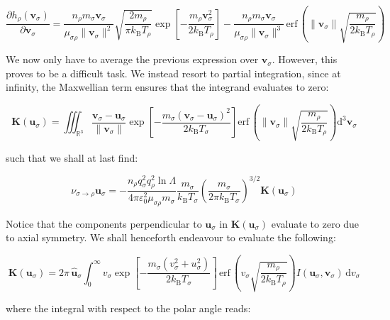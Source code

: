 \begin{equation}
    \frac{\partial h_\rho(\mathbf{v}_\sigma)}{\partial\mathbf{v}_\sigma}=\frac{n_\rho m_\sigma\mathbf{v}_\sigma}{\mu_{\sigma\rho}\|\mathbf{v}_\sigma\|^2}\sqrt{\frac{2m_\rho}{\pi k_\mathrm{B}T_\rho}}\exp{\left[-\frac{m_\rho\mathbf{v}_\sigma^2}{2k_\mathrm{B}T_\rho}\right]}-\frac{n_\rho m_\sigma\mathbf{v}_\sigma}{\mu_{\sigma\rho}\|\mathbf{v}_\sigma\|^3}\,\text{erf}\,\left(\|\mathbf{v}_\sigma\|\sqrt{\frac{m_\rho}{2k_\mathrm{B}T_\rho}}\right)
\end{equation}

We now only have to average the previous expression over $\mathbf{v}_\sigma$. However, this proves to be a difficult task. We instead resort to partial integration, since at infinity, the Maxwellian term ensures that the integrand evaluates to zero:

\begin{equation}
    \mathbf{K}(\mathbf{u}_\sigma)=\iiint_{\mathbb{R}^3}\frac{\mathbf{v}_\sigma-\mathbf{u}_\sigma}{\|\mathbf{v}_\sigma\|}\exp{\left[-\frac{m_\sigma(\mathbf{v}_\sigma-\mathbf{u}_\sigma)^2}{2k_\mathrm{B}T_\sigma}\right]}\text{erf}\,\left(\|\mathbf{v}_\sigma\|\sqrt{\frac{m_\rho}{2k_\mathrm{B}T_\rho}}\right)\mathrm{d}^3\mathbf{v}_\sigma
\end{equation}

such that we shall at last find:

\begin{equation}
    \nu_{\sigma\to\rho}\mathbf{u}_\sigma=-\frac{n_\rho q_\sigma^2q_\rho^2\ln{\Lambda}}{4\pi\varepsilon_0^2\mu_{\sigma\rho}m_\sigma}\frac{m_\sigma}{k_\mathrm{B}T_\sigma}\left(\frac{m_\sigma}{2\pi k_\mathrm{B}T_\sigma}\right)^{3/2}\mathbf{K}(\mathbf{u}_\sigma)
\end{equation}

Notice that the components perpendicular to $\mathbf{u}_\sigma$ in $\mathbf{K}(\mathbf{u}_\sigma)$ evaluate to zero due to axial symmetry. We shall henceforth endeavour to evaluate the following:

\begin{equation}
    \mathbf{K}(\mathbf{u}_\sigma)=2\pi\,\mathbf{\hat{u}}_\sigma\int_0^\infty v_\sigma\exp{\left[-\frac{m_\sigma(v_\sigma^2+u_\sigma^2)}{2k_\mathrm{B}T_\sigma}\right]}\,\text{erf}\,\left(v_\sigma\sqrt{\frac{m_\rho}{2k_\mathrm{B}T_\rho}}\right)I(\mathbf{u}_\sigma,\mathbf{v}_\sigma)\,\mathrm{d}v_\sigma
\end{equation}

where the integral with respect to the polar angle reads:

